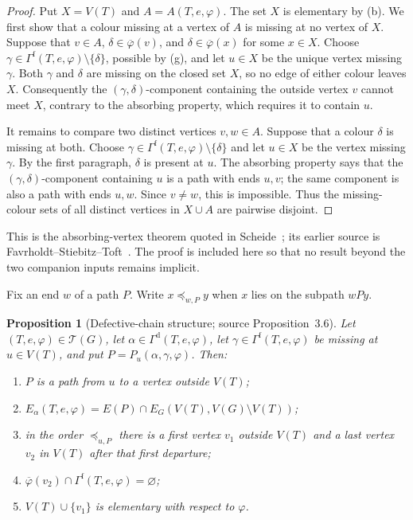 \documentclass[11pt]{article}
\newtheorem{proposition}[proposition]{Proposition}
\theoremstyle{definition}
\newcommand{\Tcal}{\mathcal T}
\newcommand{\Dcol}{\Gamma^{\mathrm d}}
\newcommand{\Fcol}{\Gamma^{\mathrm f}}
\newcommand{\set}[1]{\{#1\}}
\newcommand{\comp}{\mathbin{\setminus}}
\begin{document}
\begin{proof}
Put $X=V(T)$ and $A=A(T,e,\varphi)$. The set $X$ is elementary by
(b). We first show that a colour missing at a
vertex of $A$ is missing at no vertex of $X$. Suppose that
$v\in A$, $\delta\in\overline\varphi(v)$, and
$\delta\in\overline\varphi(x)$ for some $x\in X$. Choose
$\gamma\in\Fcol(T,e,\varphi)\comp\set{\delta}$, possible by
(g), and let $u\in X$ be the unique vertex
missing $\gamma$. Both $\gamma$ and $\delta$ are missing on the closed set $X$, so no
edge of either colour leaves $X$. Consequently the
$(\gamma,\delta)$-component containing the outside vertex $v$ cannot meet
$X$, contrary to the absorbing property, which requires it to contain $u$.

It remains to compare two distinct vertices $v,w\in A$. Suppose that a
colour $\delta$ is missing at both. Choose
$\gamma\in\Fcol(T,e,\varphi)\comp\set{\delta}$ and let $u\in X$ be the
vertex missing $\gamma$. By the first paragraph, $\delta$ is present at
$u$. The absorbing property says that the
$(\gamma,\delta)$-component containing $u$ is a path with ends $u,v$; the
same component is also a path with ends $u,w$. Since $v\ne w$, this is
impossible. Thus the missing-colour sets of all distinct vertices in
$X\cup A$ are pairwise disjoint.
\end{proof}

This is the absorbing-vertex theorem quoted in
Scheide~\cite[Proposition~3.5]{S}; its earlier source is
Favrholdt--Stiebitz--Toft~\cite{FST}. The proof is included here so that no
result beyond the two companion inputs remains implicit.

Fix an end $w$ of a path $P$. Write $x\preceq_{w,P}y$ when $x$ lies on the
subpath $wPy$.

\begin{proposition}[Defective-chain structure; source Proposition~3.6]
\label{Scheide-Proposition-3.6}\label{defective-chain}
Let $(T,e,\varphi)\in\Tcal(G)$, let
$\alpha\in\Dcol(T,e,\varphi)$, let
$\gamma\in\Fcol(T,e,\varphi)$ be missing at $u\in V(T)$, and put
$P=P_u(\alpha,\gamma,\varphi)$. Then:
\begin{enumerate}[label=\textup{(\alph*)}]
\item $P$ is a path from $u$ to a vertex outside $V(T)$;
\item
$E_\alpha(T,e,\varphi)=
 E(P)\cap E_G(V(T),V(G)\comp V(T))$;
\item in the order $\preceq_{u,P}$ there is a first vertex $v_1$ outside
      $V(T)$ and a last vertex $v_2$ in $V(T)$ after that first departure;
\item $\overline\varphi(v_2)\cap\Fcol(T,e,\varphi)=\varnothing$;
\item $V(T)\cup\set{v_1}$ is elementary with respect to $\varphi$.
\end{enumerate}
\end{proposition}
\end{document}
